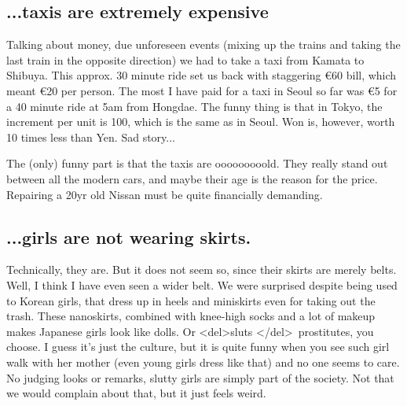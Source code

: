 \begin{post}
\begin{content}
\subsection{...taxis are extremely expensive}
\begin{figure}
\vspace{-12pt}
\vspace{-24pt}
\end{figure}Talking about money, due unforeseen events (mixing up the trains and taking the last train in the opposite direction) we had to take a taxi from Kamata to Shibuya. This approx. 30 minute ride set us back with staggering €60 bill, which meant €20 per person. The most I have paid for a taxi in Seoul so far was €5 for a 40 minute ride at 5am from Hongdae. The funny thing is that in Tokyo, the increment per unit is 100, which is the same as in Seoul. Won is, however, worth 10 times less than Yen. Sad story...

The (only) funny part is that the taxis are ooooooooold. They really stand out between all the modern cars, and maybe their age is the reason for the price. Repairing a 20yr old Nissan must be quite financially demanding.

\subsection{...girls are not wearing skirts.}
Technically, they are. But it does not seem so, since their skirts are merely belts. Well, I think I have even seen a wider belt. We were surprised despite being used to Korean girls, that dress up in heels and miniskirts even for taking out the trash. These nanoskirts, combined with knee-high socks and a lot of makeup makes Japanese girls look like dolls. Or <del>sluts </del> prostitutes, you choose. I guess it's just the culture, but it is quite funny when you see such girl walk with her mother (even young girls dress like that) and no one seems to care. No judging looks or remarks, slutty girls are simply part of the society. Not that we would complain about that, but it just feels weird.


\end{content}
\end{post}
